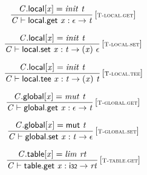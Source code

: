 $$
\begin{array}{@{}c@{}}\displaystyle
\frac{
{\mathit{C}}.\mathsf{local}{}[{\mathit{x}}] = {\mathit{init}}~{\mathit{t}}
}{
{\mathit{C}} \vdash \mathsf{local.get}~{\mathit{x}} : \epsilon \rightarrow {\mathit{t}}
} \, {[\textsc{\scriptsize T{-}local.get}]}
\qquad
\end{array}
$$

$$
\begin{array}{@{}c@{}}\displaystyle
\frac{
{\mathit{C}}.\mathsf{local}{}[{\mathit{x}}] = {\mathit{init}}~{\mathit{t}}
}{
{\mathit{C}} \vdash \mathsf{local.set}~{\mathit{x}} : {\mathit{t}} \rightarrow ({\mathit{x}})~\epsilon
} \, {[\textsc{\scriptsize T{-}local.set}]}
\qquad
\end{array}
$$

$$
\begin{array}{@{}c@{}}\displaystyle
\frac{
{\mathit{C}}.\mathsf{local}{}[{\mathit{x}}] = {\mathit{init}}~{\mathit{t}}
}{
{\mathit{C}} \vdash \mathsf{local.tee}~{\mathit{x}} : {\mathit{t}} \rightarrow ({\mathit{x}})~{\mathit{t}}
} \, {[\textsc{\scriptsize T{-}local.tee}]}
\qquad
\end{array}
$$

\vspace{1ex}

$$
\begin{array}{@{}c@{}}\displaystyle
\frac{
{\mathit{C}}.\mathsf{global}{}[{\mathit{x}}] = {\mathit{mut}}~{\mathit{t}}
}{
{\mathit{C}} \vdash \mathsf{global.get}~{\mathit{x}} : \epsilon \rightarrow {\mathit{t}}
} \, {[\textsc{\scriptsize T{-}global.get}]}
\qquad
\end{array}
$$

$$
\begin{array}{@{}c@{}}\displaystyle
\frac{
{\mathit{C}}.\mathsf{global}{}[{\mathit{x}}] = \mathsf{mut}~{\mathit{t}}
}{
{\mathit{C}} \vdash \mathsf{global.set}~{\mathit{x}} : {\mathit{t}} \rightarrow \epsilon
} \, {[\textsc{\scriptsize T{-}global.set}]}
\qquad
\end{array}
$$

\vspace{1ex}

$$
\begin{array}{@{}c@{}}\displaystyle
\frac{
{\mathit{C}}.\mathsf{table}{}[{\mathit{x}}] = {\mathit{lim}}~{\mathit{rt}}
}{
{\mathit{C}} \vdash \mathsf{table.get}~{\mathit{x}} : \mathsf{i{\scriptstyle32}} \rightarrow {\mathit{rt}}
} \, {[\textsc{\scriptsize T{-}table.get}]}
\qquad
\end{array}
$$

